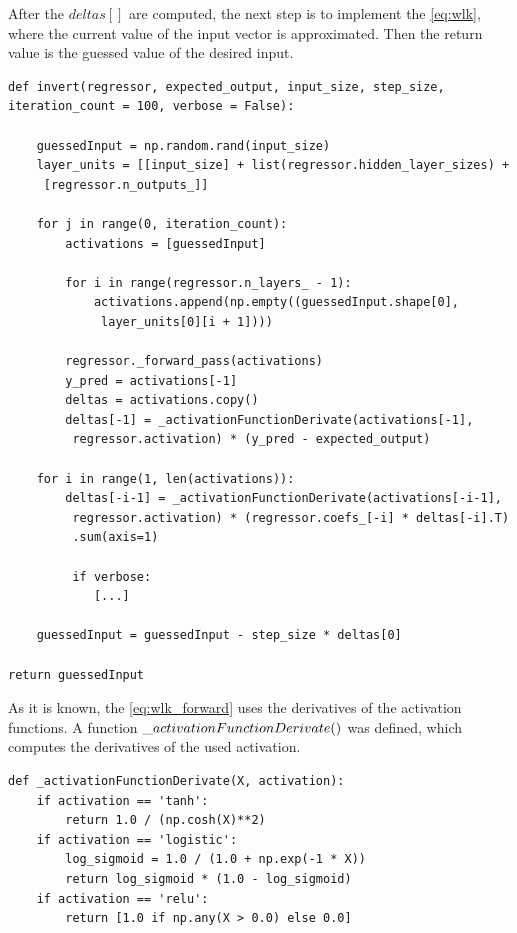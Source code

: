 After the $deltas[]$ are computed, the next step is to implement the \autoref{eq:wlk}, where the current value of the input vector is approximated. Then the return value is the guessed value of the desired input.
\begin{lstlisting}
def invert(regressor, expected_output, input_size, step_size, iteration_count = 100, verbose = False):

	guessedInput = np.random.rand(input_size)
	layer_units = [[input_size] + list(regressor.hidden_layer_sizes) +
	 [regressor.n_outputs_]]

	for j in range(0, iteration_count):
		activations = [guessedInput]

		for i in range(regressor.n_layers_ - 1):
			activations.append(np.empty((guessedInput.shape[0],
			 layer_units[0][i + 1])))

		regressor._forward_pass(activations)
		y_pred = activations[-1]
		deltas = activations.copy()
		deltas[-1] = _activationFunctionDerivate(activations[-1],
		 regressor.activation) * (y_pred - expected_output)

	for i in range(1, len(activations)):
		deltas[-i-1] = _activationFunctionDerivate(activations[-i-1], 
		 regressor.activation) * (regressor.coefs_[-i] * deltas[-i].T)
		 .sum(axis=1)
		 
		 if verbose:
			[...]

	guessedInput = guessedInput - step_size * deltas[0]

return guessedInput
\end{lstlisting}

\medskip As it is known, the \autoref{eq:wlk_forward} uses the derivatives of the activation functions. A function $\char`_activationFunctionDerivate()$ was defined, which computes the derivatives of the used activation.
\begin{lstlisting}
def _activationFunctionDerivate(X, activation):
	if activation == 'tanh':
		return 1.0 / (np.cosh(X)**2)
	if activation == 'logistic':
		log_sigmoid = 1.0 / (1.0 + np.exp(-1 * X))
		return log_sigmoid * (1.0 - log_sigmoid)
	if activation == 'relu':
		return [1.0 if np.any(X > 0.0) else 0.0]
\end{lstlisting}

